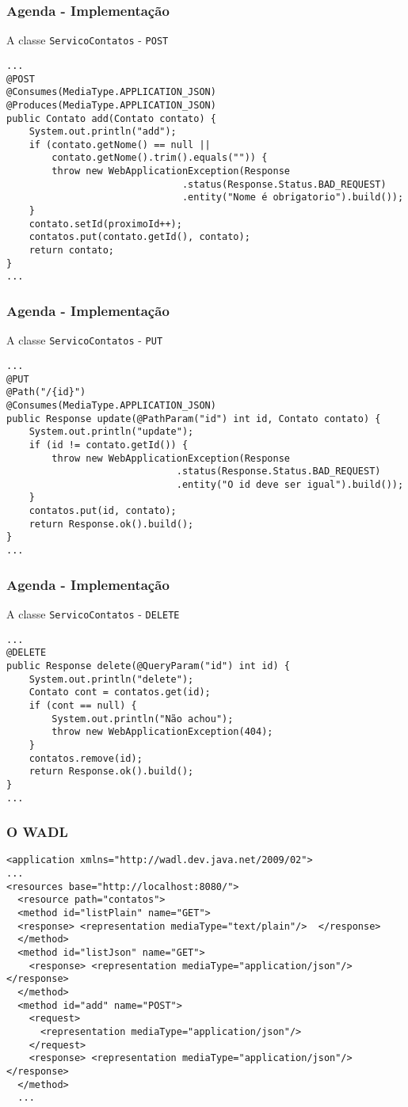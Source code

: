 \documentclass[Ligatures=TeX,table,brazil,svgnames,usetotalslideindicator,comp
ress,10pt]{beamer}
\begin{document}
\begin{frame}[fragile]
  \frametitle{Agenda - Implementação}
  A classe \texttt{ServicoContatos} - \texttt{POST}
{\footnotesize
\begin{verbatim}
...
@POST
@Consumes(MediaType.APPLICATION_JSON)
@Produces(MediaType.APPLICATION_JSON)
public Contato add(Contato contato) {
    System.out.println("add");
    if (contato.getNome() == null ||
        contato.getNome().trim().equals("")) {
        throw new WebApplicationException(Response
                               .status(Response.Status.BAD_REQUEST)
                               .entity("Nome é obrigatorio").build());
    }
    contato.setId(proximoId++);
    contatos.put(contato.getId(), contato);
    return contato;
}
...
\end{verbatim}
}
\end{frame}

\begin{frame}[fragile]
  \frametitle{Agenda - Implementação}
  A classe \texttt{ServicoContatos} - \texttt{PUT}
{\footnotesize
\begin{verbatim}
...
@PUT
@Path("/{id}")
@Consumes(MediaType.APPLICATION_JSON)
public Response update(@PathParam("id") int id, Contato contato) {
    System.out.println("update");
    if (id != contato.getId()) {
        throw new WebApplicationException(Response
                              .status(Response.Status.BAD_REQUEST)
                              .entity("O id deve ser igual").build());
    }
    contatos.put(id, contato);
    return Response.ok().build();
}
...
\end{verbatim}
}
\end{frame}


\begin{frame}[fragile]
  \frametitle{Agenda - Implementação}
  A classe \texttt{ServicoContatos} - \texttt{DELETE}
{\footnotesize
\begin{verbatim}
...
@DELETE
public Response delete(@QueryParam("id") int id) {
    System.out.println("delete");
    Contato cont = contatos.get(id);
    if (cont == null) {
        System.out.println("Não achou");
        throw new WebApplicationException(404);
    }
    contatos.remove(id);
    return Response.ok().build();
}
...
\end{verbatim}
}
\end{frame}

\begin{frame}[fragile]
  \frametitle{O WADL}
{\footnotesize
\begin{verbatim}
<application xmlns="http://wadl.dev.java.net/2009/02">
...
<resources base="http://localhost:8080/">
  <resource path="contatos">
  <method id="listPlain" name="GET">
  <response> <representation mediaType="text/plain"/>  </response>
  </method>
  <method id="listJson" name="GET">
    <response> <representation mediaType="application/json"/> </response>
  </method>
  <method id="add" name="POST">
    <request>
      <representation mediaType="application/json"/>
    </request>
    <response> <representation mediaType="application/json"/> </response>
  </method>
  ...
\end{verbatim}
}
\end{frame}
\end{document}
